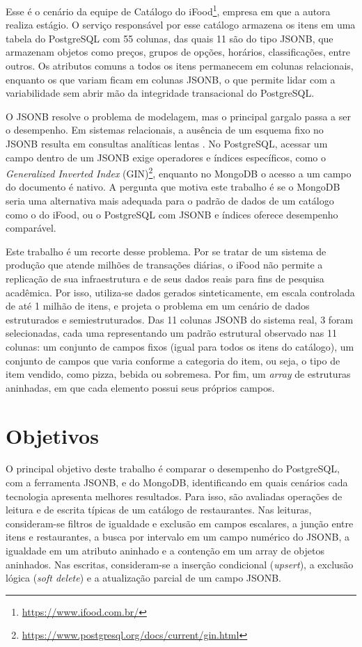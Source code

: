 Esse é o cenário da equipe de Catálogo do iFood\footnote{\url{https://www.ifood.com.br/}}, empresa em que a autora realiza estágio.
O serviço responsável por esse catálogo armazena os itens em uma tabela do PostgreSQL
com 55 colunas, das quais 11 são do tipo JSONB, que armazenam objetos como preços,
grupos de opções, horários, classificações, entre outros. Os atributos comuns a todos os
itens permanecem em colunas relacionais, enquanto os que variam ficam em colunas JSONB, o que
permite lidar com a variabilidade sem abrir mão da integridade transacional do PostgreSQL.

O JSONB resolve o problema de modelagem, mas o principal gargalo passa a ser o desempenho.
Em sistemas relacionais, a ausência de um esquema fixo no JSONB resulta em consultas analíticas
lentas \cite{Durner2021}. No PostgreSQL, acessar um campo dentro de um JSONB exige operadores
e índices específicos, como o \textit{Generalized Inverted Index} (GIN)\footnote{\url{https://www.postgresql.org/docs/current/gin.html}}, enquanto no MongoDB o acesso a um campo do documento é
nativo. A pergunta que motiva este
trabalho é se o MongoDB seria uma alternativa mais adequada para o padrão de dados de
um catálogo como o do iFood, ou o PostgreSQL com JSONB e índices oferece desempenho
comparável.

Este trabalho é um recorte desse problema. Por se tratar de um sistema de produção que
atende milhões de transações diárias, o iFood não permite a replicação de sua infraestrutura
e de seus dados reais para fins de pesquisa acadêmica. Por isso, utiliza-se dados
gerados sinteticamente, em escala controlada de até 1 milhão de itens, e projeta o problema
em um cenário de dados estruturados e semiestruturados. Das 11 colunas
JSONB do sistema real, 3 foram selecionadas, cada uma representando um padrão estrutural observado nas 11 colunas: um conjunto de campos fixos (igual para todos os itens do catálogo),
um conjunto de campos que varia conforme a categoria do item, ou seja, o tipo de item vendido, como pizza, bebida ou sobremesa. Por fim,
um \textit{array} de estruturas aninhadas, em que cada elemento possui seus próprios campos.

\section{Objetivos}

O principal objetivo deste trabalho é comparar o desempenho do PostgreSQL, com a ferramenta
JSONB, e do MongoDB, identificando em quais cenários cada tecnologia apresenta melhores resultados.
Para isso, são avaliadas operações de leitura e de escrita típicas de um catálogo de
restaurantes. Nas leituras, consideram-se filtros de igualdade e exclusão em campos
escalares, a junção entre itens e restaurantes, a busca por intervalo em um campo numérico
do JSONB, a igualdade em um atributo aninhado e a contenção em um array de objetos aninhados.
Nas escritas, consideram-se a inserção condicional (\textit{upsert}), a exclusão lógica (\textit{soft delete}) e a atualização parcial de um campo JSONB.

